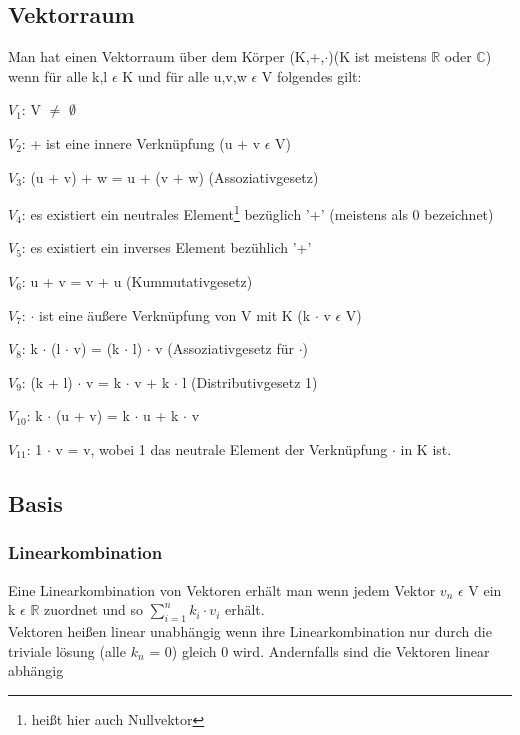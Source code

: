 \documentclass[a4paper,10pt]{scrartcl}
\begin{document}
        \subsection{Vektorraum}
            Man hat einen Vektorraum über dem Körper (K,+,$\cdot$)(K ist meistens $\mathbb{R}$ oder $\mathbb{C}$) 
            wenn für alle k,l $\epsilon$ K und für alle u,v,w $\epsilon$ V folgendes gilt:
            \begin{description}
                \item $V_1$: V $\neq$ $\emptyset$
                \item $V_2$: + ist eine innere Verknüpfung (u + v  $\epsilon$ V)
                \item $V_3$: (u + v) + w = u + (v + w) (Assoziativgesetz)
                \item $V_4$: es existiert ein neutrales Element\footnote{heißt hier auch Nullvektor} bezüglich '+' (meistens als 0 bezeichnet)
                \item $V_5$: es existiert ein inverses Element bezühlich '+' 
                \item $V_6$: u + v = v + u (Kummutativgesetz)
                \item $V_7$: $\cdot$ ist eine äußere Verknüpfung von V mit K (k $\cdot$ v $\epsilon$ V)
                \item $V_8$: k $\cdot$ (l $\cdot$ v) = (k $\cdot$ l) $\cdot$ v (Assoziativgesetz für $\cdot$)
                \item $V_9$: (k + l) $\cdot$ v = k $\cdot$ v + k $\cdot$ l (Distributivgesetz 1)
                \item $V_{10}$: k $\cdot$ (u + v) = k $\cdot$ u + k $\cdot$ v
                \item $V_{11}$: 1 $\cdot$ v = v, wobei 1 das neutrale Element der Verknüpfung $\cdot$ in K ist.
            \end{description} 
        \subsection{Basis}
            \subsubsection{Linearkombination}
                Eine Linearkombination von Vektoren erhält man wenn jedem Vektor $v_n$ $\epsilon$ V ein \\ k $\epsilon$ $\mathbb{R}$ zuordnet und so 
                \(\sum \limits_{i=1}^n k_i \cdot v_i \) erhält.\\
                Vektoren heißen linear unabhängig wenn ihre Linearkombination nur durch die triviale lösung (alle $k_n$ = 0) gleich 0 wird. Andernfalls sind die Vektoren linear abhängig
            \newpage
\end{document}
